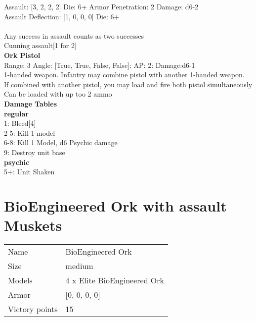 Assault: [3, 2, 2, 2] Die: 6+ Armor Penetration: 2 Damage: d6-2 \\
Assault Deflection: [1, 0, 0, 0] Die: 6+\\
\\
Any success in assault counts as two successes \\
Cunning assault[1 for 2]\\ 
 



{\bf Ork Pistol } \\



Range: 3  Angle: [True, True, False, False]: AP: 2: Damage:d6-1 \\
1-handed weapon. Infantry may combine pistol with another 1-handed weapon.\\ 
If combined with another pistol, you may load and fire both pistol simultaneously\\ 
Can be loaded with up too 2 ammo\\ 




 





{\bf Damage Tables} \\
 {\bf regular } \\
1: Bleed[4] \\
2-5: Kill 1 model \\
6-8: Kill 1 Model, d6 Psychic damage \\
9: Destroy unit base \\
 {\bf psychic } \\
5+: Unit Shaken \\










\pagebreak\pagebreak

\section{ BioEngineered Ork with assault Muskets }

\begin{tabular}{ll}
  Name & BioEngineered Ork \\
  Size & medium\\
  Models & 4 x Elite BioEngineered Ork\\
  Armor & [0, 0, 0, 0]\\
  Victory points & 15\\
\end{tabular}

